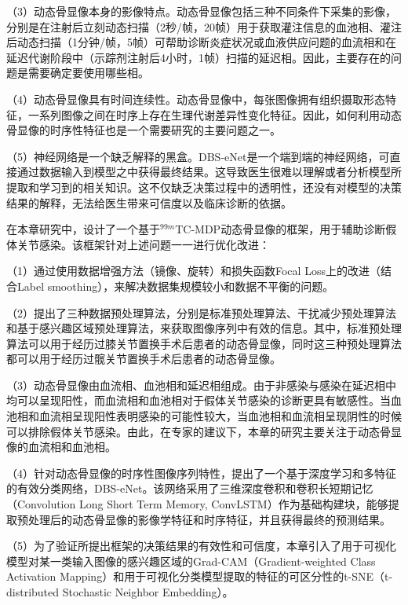 （3）动态骨显像本身的影像特点。动态骨显像包括三种不同条件下采集的影像，分别是在注射后立刻动态扫描（2秒/帧，20帧）用于获取灌注信息的血池相、灌注后动态扫描（1分钟/帧，5帧）可帮助诊断炎症状况或血液供应问题的血流相\cite{schauwecker1992scintigraphic}和在延迟代谢阶段中（示踪剂注射后4小时，1帧）扫描的延迟相。因此，主要存在的问题是需要确定要使用哪些相。

（4）动态骨显像具有时间连续性。动态骨显像中，每张图像拥有组织摄取形态特征，一系列图像之间在时序上存在生理代谢差异性变化特征。因此，如何利用动态骨显像的时序性特征也是一个需要研究的主要问题之一。

（5）神经网络是一个缺乏解释的黑盒。DBS-eNet是一个端到端的神经网络，可直接通过数据输入到模型之中获得最终结果。这导致医生很难以理解或者分析模型所提取和学习到的相关知识。这不仅缺乏决策过程中的透明性，还没有对模型的决策结果的解释，无法给医生带来可信度以及临床诊断的依据。

在本章研究中，设计了一个基于\(^{99m}\)TC-MDP动态骨显像的框架，用于辅助诊断假体关节感染。该框架针对上述问题一一进行优化改进：

（1）通过使用数据增强方法（镜像、旋转）和损失函数Focal Loss\cite{lin2017focal}上的改进（结合Label smoothing\cite{zhang2021delving}），来解决数据集规模较小和数据不平衡的问题。

（2）提出了三种数据预处理算法，分别是标准预处理算法、干扰减少预处理算法和基于感兴趣区域预处理算法，来获取图像序列中有效的信息。其中，标准预处理算法可以用于经历过膝关节置换手术后患者的动态骨显像，同时这三种预处理算法都可以用于经历过髋关节置换手术后患者的动态骨显像。

（3）动态骨显像由血流相、血池相和延迟相组成。由于非感染与感染在延迟相中均可以呈现阳性，而血流相和血池相对于假体关节感染的诊断更具有敏感性。当血池相和血流相呈现阳性表明感染的可能性较大，当血池相和血流相呈现阴性的时候可以排除假体关节感染。由此，在专家的建议下，本章的研究主要关注于动态骨显像的血流相和血池相。

（4）针对动态骨显像的时序性图像序列特性，提出了一个基于深度学习和多特征的有效分类网络，DBS-eNet。该网络采用了三维深度卷积和卷积长短期记忆（Convolution Long Short Term Memory, ConvLSTM）\cite{shi2015convolutional}作为基础构建块，能够提取预处理后的动态骨显像的影像学特征和时序特征，并且获得最终的预测结果。

（5）为了验证所提出框架的决策结果的有效性和可信度，本章引入了用于可视化模型对某一类输入图像的感兴趣区域的Grad-CAM（Gradient-weighted Class Activation Mapping）\cite{selvaraju2017grad}和用于可视化分类模型提取的特征的可区分性的t-SNE（t-distributed Stochastic Neighbor Embedding）\cite{van2008visualizing}。

